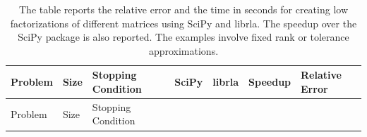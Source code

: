 \documentclass[
  12pt,
]{article}
\begin{document}
\begin{longtable}[]{@{}
  >{\raggedright\arraybackslash}p{}
  >{\raggedright\arraybackslash}p{}
  >{\raggedright\arraybackslash}p{}
  >{\raggedright\arraybackslash}p{}
  >{\raggedright\arraybackslash}p{}
  >{\raggedright\arraybackslash}p{}
  >{\raggedright\arraybackslash}p{}@{}}
\caption{The table reports the relative error and the time in seconds
for creating low factorizations of different matrices using SciPy and
librla. The speedup over the SciPy package is also reported. The
examples involve fixed rank or tolerance approximations.}\tabularnewline
\toprule\noalign{}
\begin{minipage}[b]{\linewidth}\raggedright
Problem
\end{minipage} & \begin{minipage}[b]{\linewidth}\raggedright
Size
\end{minipage} & \begin{minipage}[b]{\linewidth}\raggedright
Stopping Condition
\end{minipage} & \begin{minipage}[b]{\linewidth}\raggedright
SciPy
\end{minipage} & \begin{minipage}[b]{\linewidth}\raggedright
librla
\end{minipage} & \begin{minipage}[b]{\linewidth}\raggedright
Speedup
\end{minipage} & \begin{minipage}[b]{\linewidth}\raggedright
Relative Error
\end{minipage} \\
\midrule\noalign{}
\endfirsthead
\toprule\noalign{}
\begin{minipage}[b]{\linewidth}\raggedright
Problem
\end{minipage} & \begin{minipage}[b]{\linewidth}\raggedright
Size
\end{minipage} & \begin{minipage}[b]{\linewidth}\raggedright
Stopping Condition
\end{minipage} & \begin{minipage}[b]{\linewidth}\raggedright

\end{minipage}
\end{longtable}
\end{document}

